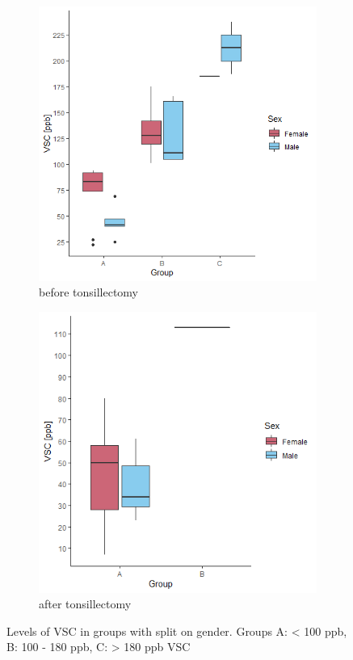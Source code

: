 \documentclass[12pt,a4paper,notitlepage]{report}
\begin{document}
\begin{figure}[H]
	\centering
	\begin{subfigure}[b]{0.49\textwidth}
		\includegraphics[width=\textwidth]{./Figures/Fig_3.1a} 
		\caption{before tonsillectomy}
		\label{fig:Fig_3.1a}
	\end{subfigure} 
	\begin{subfigure}[b]{0.49\textwidth}
		\includegraphics[width=\textwidth]{./Figures/Fig_3.1b}
		\caption{after tonsillectomy}
		\label{fig:Fig_3.1b}
	\end{subfigure}
	 
	\caption{Levels of VSC in groups with split on gender. Groups A: < 100 ppb,  B: 100 - 180 ppb, C: > 180 ppb VSC}
	\label{fig:Fig_3.1}
\end{figure}
\end{document}
